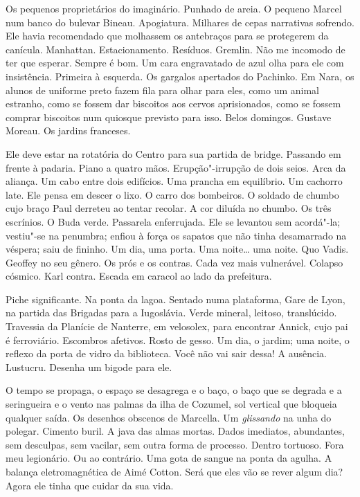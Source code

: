 Os pequenos proprietários do imaginário. Punhado de areia. O pequeno
Marcel num banco do bulevar Bineau. Apogiatura. Milhares de cepas
narrativas sofrendo. Ele havia recomendado que molhassem os antebraços
para se protegerem da canícula. Manhattan. Estacionamento. Resíduos.
Gremlin. Não me incomodo de ter que esperar. Sempre é bom. Um cara
engravatado de azul olha para ele com insistência. Primeira à esquerda.
Os gargalos apertados do Pachinko. Em Nara, os alunos de uniforme preto
fazem fila para olhar para eles, como um animal estranho, como se fossem
dar biscoitos aos cervos aprisionados, como se fossem comprar biscoitos
num quiosque previsto para isso. Belos domingos. Gustave Moreau. Os
jardins franceses.

Ele deve estar na rotatória do Centro para sua partida de bridge.
Passando em frente à padaria. Piano a quatro mãos. Erupção"-irrupção de
dois seios. Arca da aliança. Um cabo entre dois edifícios. Uma prancha
em equilíbrio. Um cachorro late. Ele pensa em descer o lixo. O carro dos
bombeiros. O soldado de chumbo cujo braço Paul derreteu ao tentar
recolar. A cor diluída no chumbo. Os três escrínios. O Buda verde.
Passarela enferrujada. Ele se levantou sem acordá"-la; vestiu"-se na
penumbra; enfiou à força os sapatos que não tinha desamarrado na
véspera; saiu de fininho. Um dia, uma porta. Uma noite\ldots{} uma noite. Quo
Vadis. Geoffey no seu gênero. Os prós e os contras. Cada vez mais
vulnerável. Colapso cósmico. Karl contra. Escada em caracol ao lado da
prefeitura.

Piche significante. Na ponta da lagoa. Sentado numa plataforma, Gare de
Lyon, na partida das Brigadas para a Iugoslávia. Verde mineral, leitoso,
translúcido. Travessia da Planície de Nanterre, em velosolex, para
encontrar Annick, cujo pai é ferroviário. Escombros afetivos. Rosto de
gesso. Um dia, o jardim; uma noite, o reflexo da porta de vidro da
biblioteca. Você não vai sair dessa! A ausência. Lustucru. Desenha um
bigode para ele.

O tempo se propaga, o espaço se desagrega e o baço, o baço que se
degrada e a seringueira e o vento nas palmas da ilha de Cozumel, sol
vertical que bloqueia qualquer saída. Os desenhos obscenos de Marcella.
Um \emph{glissando} na unha do polegar. Cimento buril. A java das almas
mortas. Dados imediatos, abundantes, sem desculpas, sem vacilar, sem
outra forma de processo. Dentro tortuoso. Fora meu legionário. Ou ao
contrário. Uma gota de sangue na ponta da agulha. A balança
eletromagnética de Aimé Cotton. Será que eles vão se rever algum dia?
Agora ele tinha que cuidar da sua vida.


